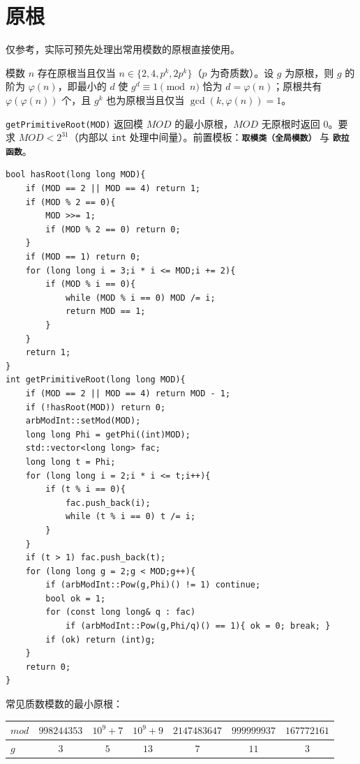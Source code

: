 \section{原根}

仅参考，实际可预先处理出常用模数的原根直接使用。

模数 $n$ 存在原根当且仅当 $n\in\{2,4,p^k,2p^k\}$（$p$ 为奇质数）。设 $g$ 为原根，则 $g$ 的阶为 $\varphi(n)$，即最小的 $d$ 使 $g^{d}\equiv 1\pmod{n}$ 恰为 $d=\varphi(n)$；原根共有 $\varphi(\varphi(n))$ 个，且 $g^{k}$ 也为原根当且仅当 $\gcd(k,\varphi(n))=1$。

\verb|getPrimitiveRoot(MOD)| 返回模 $MOD$ 的最小原根，$MOD$ 无原根时返回 $0$。要求 $MOD<2^{31}$（内部以 \texttt{int} 处理中间量）。前置模板：\textbf{\texttt{取模类（全局模数）}} 与 \textbf{\texttt{欧拉函数}}。

\begin{lstlisting}
bool hasRoot(long long MOD){
    if (MOD == 2 || MOD == 4) return 1;
    if (MOD % 2 == 0){
        MOD >>= 1;
        if (MOD % 2 == 0) return 0;
    }
    if (MOD == 1) return 0;
    for (long long i = 3;i * i <= MOD;i += 2){
        if (MOD % i == 0){
            while (MOD % i == 0) MOD /= i;
            return MOD == 1;
        }
    }
    return 1;
}
int getPrimitiveRoot(long long MOD){
    if (MOD == 2 || MOD == 4) return MOD - 1;
    if (!hasRoot(MOD)) return 0;
    arbModInt::setMod(MOD);
    long long Phi = getPhi((int)MOD);
    std::vector<long long> fac;
    long long t = Phi;
    for (long long i = 2;i * i <= t;i++){
        if (t % i == 0){
            fac.push_back(i);
            while (t % i == 0) t /= i;
        }
    }
    if (t > 1) fac.push_back(t);
    for (long long g = 2;g < MOD;g++){
        if (arbModInt::Pow(g,Phi)() != 1) continue;
        bool ok = 1;
        for (const long long& q : fac)
            if (arbModInt::Pow(g,Phi/q)() == 1){ ok = 0; break; }
        if (ok) return (int)g;
    }
    return 0;
}
\end{lstlisting}

常见质数模数的最小原根：

\begin{center}
\begin{tabular}{l|cccccc}
$mod$ & $998244353$ & $10^9+7$ & $10^9+9$ & $2147483647$ & $999999937$ & $167772161$ \\
\hline
$g$ & $3$ & $5$ & $13$ & $7$ & $11$ & $3$ \\
\end{tabular}
\end{center}
